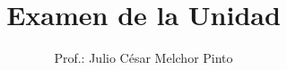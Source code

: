 \documentclass[12pt]{evalua}
\title{Examen de la Unidad}
\author{Prof.: Julio César Melchor Pinto}
\begin{document}
\begin{multicols}{2}
    
    
    
    
\end{multicols}

\begin{questions}
    
    \newpage
    
    \newpage
    
    \newpage
    \begin{multicols}{2}
        
    \end{multicols}
    \newpage
    
\end{questions}
\end{document}
